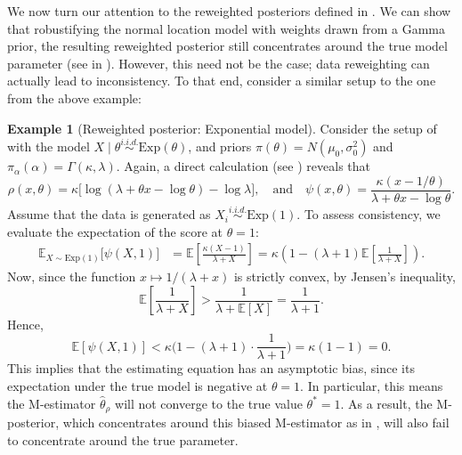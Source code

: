 \documentclass[11pt, oneside]{amsart}
\theoremstyle{definition}   %
\newtheorem{example}{Example}
\newcommand{\E}{\mathbb{E}}
\begin{document}
%
We now turn our attention to the reweighted posteriors defined in .  We can show that robustifying the normal location model with weights drawn from a Gamma prior, the resulting reweighted posterior still concentrates around the true model parameter (see  in ). However, this need not be the case; data reweighting can actually lead to inconsistency. To that end, consider a similar setup to the one from the above example:
%
\begin{example}[Reweighted posterior: Exponential model]
\label{example::BvM-reweighted-posterior-2}
   Consider the setup of  with the model \( X\mid\theta \overset{i.i.d.}{\sim} \mathrm{Exp}(\theta) \), and priors \( \pi(\theta) = N(\mu_0,\sigma_0^2) \) and \( \pi_\alpha(\alpha)= \Gamma(\kappa, \lambda) \).
    Again, a direct calculation (see ) reveals that
    \begin{equation*}
        \rho(x, \theta) 
        = 
        \kappa\bigl[ \log(\lambda+\theta x-\log\theta)-\log\lambda \bigr],
        \quad
        \text{and}
        \quad
        \psi(x, \theta)
        =
        \frac{\kappa(x-1/\theta)}{\lambda+\theta x-\log\theta}.
    \end{equation*}
    Assume that the data is generated as \( X_i \overset{i.i.d.}{\sim} \mathrm{Exp}(1) \).
    To assess consistency, we evaluate the expectation of the score at \( \theta = 1 \):
    \[
    \begin{split}
        \E_{X \sim \mathrm{Exp}(1)} \bigl [ \psi(X, 1) \bigr ] 
        &=
        \E \left [ \frac{\kappa(X-1)}{\lambda+X} \right ]
        = 
        \kappa \left ( 1 - (\lambda + 1) \E \left [ \frac{1}{\lambda + X} \right ] \right ).
    \end{split}
    \]
    Now, since the function \( x \mapsto 1/(\lambda + x) \) is strictly convex, by Jensen's inequality,
    \[
        \E \left[ \frac{1}{\lambda + X} \right] > \frac{1}{\lambda + \E[X]} = \frac{1}{\lambda + 1}.
    \]
    Hence,
    \[
        \E [\psi(X, 1)] < \kappa \Big( 1 - (\lambda + 1) \cdot \frac{1}{\lambda + 1} \Big) = \kappa(1 - 1) = 0.
    \]
    This implies that the estimating equation has an asymptotic bias, since its expectation under the true model is negative at \( \theta = 1 \).
    In particular, this means the M-estimator \( \hat{\theta}_\rho \) will not converge to the true value \( \theta^* = 1 \).
    As a result, the M-posterior, which concentrates around this biased M-estimator as in , will also fail to concentrate around the true parameter.
\end{example}
%
\end{document}
